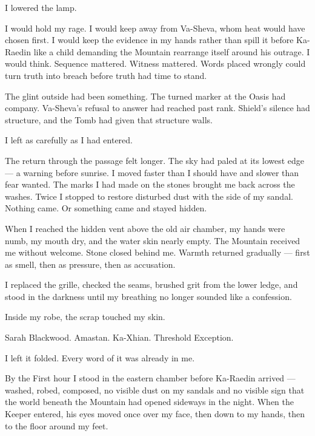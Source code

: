 I lowered the lamp.\par

I would hold my rage. I would keep away from Va-Sheva, whom heat would have chosen first. I would keep the evidence in my hands rather than spill it before Ka-Raedin like a child demanding the Mountain rearrange itself around his outrage. I would think. Sequence mattered. Witness mattered. Words placed wrongly could turn truth into breach before truth had time to stand.\par

The glint outside had been something. The turned marker at the Oasis had company. Va-Sheva's refusal to answer had reached past rank. Shield's silence had structure, and the Tomb had given that structure walls.\par

I left as carefully as I had entered.\par

The return through the passage felt longer. The sky had paled at its lowest edge --- a warning before sunrise. I moved faster than I should have and slower than fear wanted. The marks I had made on the stones brought me back across the washes. Twice I stopped to restore disturbed dust with the side of my sandal. Nothing came. Or something came and stayed hidden.\par

When I reached the hidden vent above the old air chamber, my hands were numb, my mouth dry, and the water skin nearly empty. The Mountain received me without welcome. Stone closed behind me. Warmth returned gradually --- first as smell, then as pressure, then as accusation.\par

I replaced the grille, checked the seams, brushed grit from the lower ledge, and stood in the darkness until my breathing no longer sounded like a confession.\par

Inside my robe, the scrap touched my skin.\par

Sarah Blackwood. Amastan. Ka-Xhian. Threshold Exception.\par

I left it folded. Every word of it was already in me.\par

By the First hour I stood in the eastern chamber before Ka-Raedin arrived --- washed, robed, composed, no visible dust on my sandals and no visible sign that the world beneath the Mountain had opened sideways in the night. When the Keeper entered, his eyes moved once over my face, then down to my hands, then to the floor around my feet.\par

